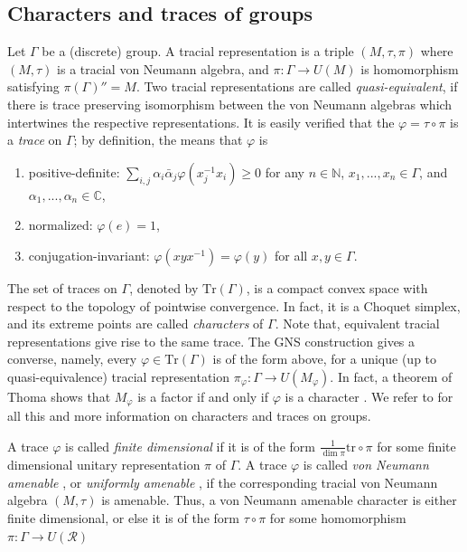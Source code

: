 \documentclass[11pt]{amsart}
\newcommand{\Tr}[1]{\mathrm{Tr}\left(#1\right)}
\newcommand{\N}{{\mathbb{N}}}
\newcommand{\C}{{\mathbb{C}}}
\theoremstyle{definition}
\theoremstyle{remark}
\theoremstyle{definition}
\begin{document}
\subsection{Characters  and traces of groups}\label{subsec:chars}
Let $\Gamma$ be a (discrete) group. A tracial representation is a triple $(M,\tau,\pi)$ where $(M,\tau)$ is a tracial von Neumann algebra, and $\pi:\Gamma \to U(M)$ is homomorphism satisfying $\pi(\Gamma)''=M$. Two tracial representations are called \emph{quasi-equivalent}, if there is trace preserving isomorphism between the von Neumann algebras which intertwines the respective representations. It is easily verified that the $\varphi=\tau\circ \pi$ is a \emph{trace} on $\Gamma$;
by definition, the means that $\varphi$ is
\begin{enumerate}
    \item  positive-definite: $\sum_{i,j}\alpha_i \bar{\alpha}_j \varphi(x_j ^{-1}x_i)\geq 0$ for any $n\in \N$, $x_1 ,...,x_n\in \Gamma$, and $\alpha_1 ,...,\alpha_n \in \C$,
    \item normalized: $\varphi(e)=1$,
    \item conjugation-invariant: $\varphi(xyx^{-1})=\varphi(y)$ for all $x,y\in \Gamma$. 
\end{enumerate}
The set of traces on $\Gamma$, denoted by $\Tr{\Gamma}$, is a compact convex space with respect to the topology of pointwise convergence.
In fact, it is a Choquet simplex, and its extreme points are called \emph{characters} of $\Gamma$.
Note that, equivalent tracial representations give rise to the same trace. 
The GNS construction gives a converse, namely, every $\varphi \in \Tr{\Gamma}$ is of the form above, for a unique (up to quasi-equivalence) tracial representation $\pi_\varphi: \Gamma \to U(M_\varphi)$. 
In fact, a theorem of Thoma shows that $M_\varphi$ is a factor if and only if $\varphi$ is a character \cite{thoma1964unitare}.
We refer to \cite[Chapter 11]{BdlH} for all this and more information on characters and traces on groups.

A trace $\varphi$ is called \emph{finite dimensional} if it is of the form $\frac{1}{\dim\pi}\mathrm{tr}\circ{\pi}$ for some finite dimensional unitary representation $\pi$ of $\Gamma$. 
A trace $\varphi$ is called \emph{von Neumann amenable} \cite{BBHP}, or \emph{uniformly amenable} \cite{Brown}, if the corresponding tracial von Neumann algebra $(M,\tau)$ is amenable.
Thus, a von Neumann amenable character is either finite dimensional, or else it is of the form $\tau\circ\pi$ for some homomorphism $\pi:\Gamma\to U(\mathcal{R})$
\end{document}
